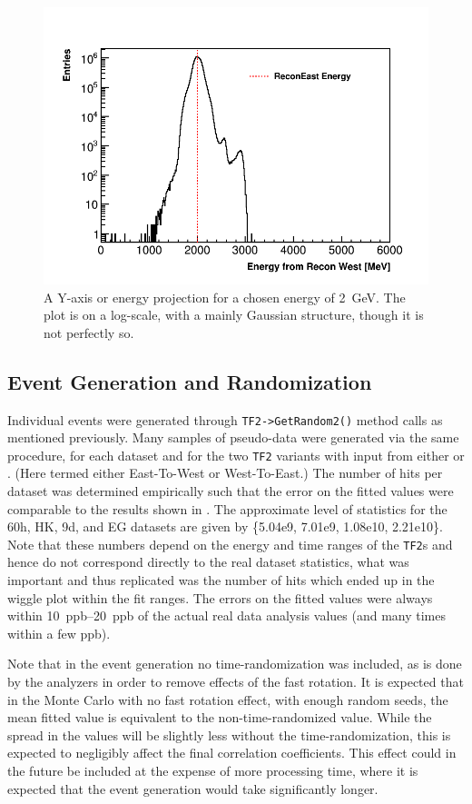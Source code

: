 \begin{figure}[]
\centering
\includegraphics[width=.7\textwidth]{ReconEastvWest_Projection}
\caption{A Y-axis or \RW energy projection for a chosen \RE energy of \SI{2}{\GeV}. The plot is on a log-scale, with a mainly Gaussian structure, though it is not perfectly so.}
\label{fig:EvWprojection}
\end{figure}




\subsection{Event Generation and Randomization}


Individual events were generated through \texttt{TF2->GetRandom2()} method calls as mentioned previously. Many samples of pseudo-data were generated via the same procedure, for each dataset and for the two \texttt{TF2} variants with input from either \RE or \RW. (Here termed either East-To-West or West-To-East.) The number of hits per dataset was determined empirically such that the error on the fitted \R values were comparable to the \Rone results shown in . The approximate level of statistics for the 60h, HK, 9d, and EG datasets are given by \{5.04e9, 7.01e9, 1.08e10, 2.21e10\}. Note that these numbers depend on the energy and time ranges of the \texttt{TF2}s and hence do not correspond directly to the real dataset statistics, what was important and thus replicated was the number of hits which ended up in the wiggle plot within the fit ranges. The errors on the fitted \R values were always within \SIrange{10}{20}{ppb} of the actual real data analysis values (and many times within a few ppb).

Note that in the event generation no time-randomization was included, as is done by the analyzers in order to remove effects of the fast rotation. It is expected that in the Monte Carlo with no fast rotation effect, with enough random seeds, the mean fitted \R value is equivalent to the non-time-randomized \R value. While the spread in the \R values will be slightly less without the time-randomization, this is expected to negligibly affect the final correlation coefficients. This effect could in the future be included at the expense of more processing time, where it is expected that the event generation would take significantly longer.

